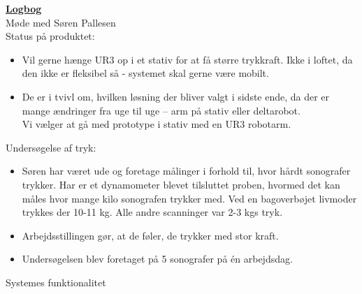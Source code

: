 \underline{\textbf{Logbog}}\\
Møde med Søren Pallesen\\
Status på produktet:
\begin{itemize}
\item Vil gerne hænge UR3 op i et stativ for at få større trykkraft. Ikke i loftet, da den ikke er fleksibel så - systemet skal gerne være mobilt. 
\item De er i tvivl om, hvilken løsning der bliver valgt i sidste ende, da der er mange ændringer fra uge til uge – arm på stativ eller deltarobot. \\
Vi vælger at gå med prototype i stativ med en UR3 robotarm. 
\end{itemize}
Undersøgelse af tryk:
\begin{itemize}
\item Søren har været ude og foretage målinger i forhold til, hvor hårdt sonografer trykker. Har er et dynamometer blevet tilsluttet proben, hvormed det kan måles hvor mange kilo sonografen trykker med. Ved en bagoverbøjet livmoder trykkes der 10-11 kg. Alle andre scanninger var 2-3 kgs tryk. 
\item Arbejdsstillingen gør, at de føler, de trykker med stor kraft. 
\item Undersøgelsen blev foretaget på 5 sonografer på én arbejdsdag.
\end{itemize}
Systemes funktionalitet
